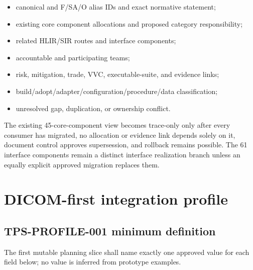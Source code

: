\documentclass[11pt,letterpaper]{article}
\begin{document}
\begin{itemize}
\item canonical and F/SA/O alias IDs and exact normative statement;
\item existing core component allocations and proposed category responsibility;
\item related HLIR/SIR routes and interface components;
\item accountable and participating teams;
\item risk, mitigation, trade, VVC, executable-suite, and evidence links;
\item build/adopt/adapter/configuration/procedure/data classification;
\item unresolved gap, duplication, or ownership conflict.
\end{itemize}

The existing 45-core-component view becomes trace-only only after every consumer has migrated, no allocation or evidence link depends solely on it, document control approves supersession, and rollback remains possible. The 61 interface components remain a distinct interface realization branch unless an equally explicit approved migration replaces them.

\section{DICOM-first integration profile}

\subsection{TPS-PROFILE-001 minimum definition}

The first mutable planning slice shall name exactly one approved value for each field below; no value is inferred from prototype examples.
\end{document}
